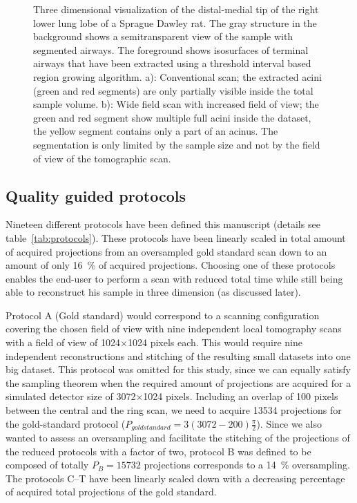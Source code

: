 \begin{figure}[htp]
{%
		}%
		\caption{Three dimensional visualization of the distal-medial tip of the right lower lung lobe of a Sprague Dawley rat. The gray structure in the background shows a semitransparent view of the sample with segmented airways. The foreground shows isosurfaces of terminal airways that have been extracted using a threshold interval based region growing algorithm. a): Conventional scan; the extracted acini (green and red segments) are only partially visible inside the total sample volume. b): Wide field scan with increased field of view; the green and red segment show multiple full acini inside the dataset, the yellow segment contains only a part of an acinus. The segmentation is only limited by the sample size and not by the field of view of the tomographic scan.}%
		\label{fig:s2-wfs}%
	\end{figure}
\fi

\subsection{Quality guided protocols}%
Nineteen different protocols have been defined this manuscript (details see table~\ref{tab:protocols}). These protocols have been linearly scaled in total amount of acquired projections from an oversampled gold standard scan down to an amount of only \SI{16}{\percent} of acquired projections. Choosing one of these protocols enables the end-user to perform a scan with reduced total time while still being able to reconstruct his sample in three dimension (as discussed later).

Protocol A (Gold standard) would correspond to a scanning configuration covering the chosen field of view with nine independent local tomography scans with a field of view of 1024$\times$1024 pixels each. This would require nine independent reconstructions and stitching of the resulting small datasets into one big dataset. This protocol was omitted for this study, since we can equally satisfy the sampling theorem when the required amount of projections are acquired for a simulated detector size of 3072$\times$1024 pixels. Including an overlap of 100 pixels between the central and the ring scan, we need to acquire 13534 projections for the gold-standard protocol ($P_{goldstandard}=3(3072-200)\frac{\pi}{2}$). Since we also wanted to assess an oversampling and facilitate the stitching of the projections of the reduced protocols with a factor of two, protocol B was defined to be composed of totally $P_{B}=15732$ projections corresponds to a \SI{14}{\percent} oversampling. The protocols C--T have been linearly scaled down with a decreasing percentage of acquired total projections of the gold standard.

